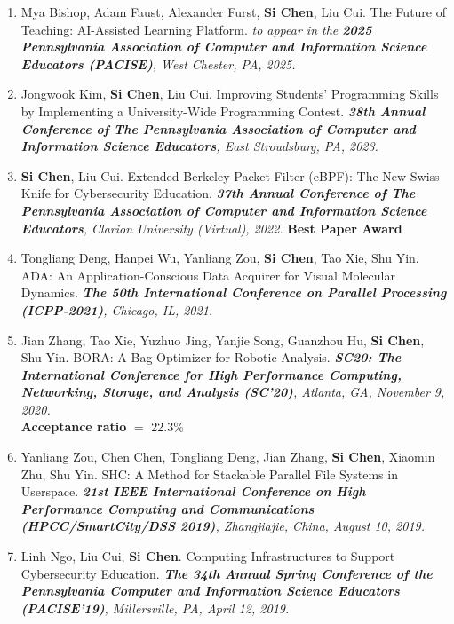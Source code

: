 \documentclass[letter]{article}
\newcommand{\publication}[4]{\item #1. #2. \emph{#3.} #4}
\begin{document}
\begin{description}
\begin{enumerate}[{C-}1.]
\publication{Mya Bishop, Adam Faust, Alexander Furst, \textbf{Si Chen}, Liu Cui}
            {The Future of Teaching: AI-Assisted Learning Platform}
            {\textit{to appear in} the \textbf{2025 Pennsylvania Association of Computer and Information Science Educators (PACISE)}, West Chester, PA, 2025}\\



\publication{Jongwook Kim, \textbf{Si Chen}, Liu Cui} {Improving Students' Programming Skills by Implementing a University-Wide Programming Contest} {\textbf{38th Annual Conference of The Pennsylvania Association of Computer and Information Science Educators}, East Stroudsburg, PA, 2023}\\

\publication{\textbf{Si Chen}, Liu Cui} {Extended Berkeley Packet Filter (eBPF): The New Swiss Knife for Cybersecurity Education}  {\textbf{37th Annual Conference of The Pennsylvania Association of Computer and Information Science Educators}, Clarion University (Virtual), 2022}
\textbf{Best Paper Award}\\

\publication{Tongliang Deng, Hanpei Wu, Yanliang Zou, \textbf{Si Chen}, Tao Xie, Shu Yin} {ADA: An Application-Conscious Data Acquirer for Visual Molecular Dynamics}  {\textbf{The 50th International Conference on Parallel Processing (ICPP-2021)}, Chicago, IL, 2021}\\

\publication{Jian Zhang, Tao Xie, Yuzhuo Jing, Yanjie Song, Guanzhou Hu, \textbf{Si Chen}, Shu Yin} {BORA: A Bag Optimizer for Robotic Analysis}  {\textbf{SC20: The International Conference for High Performance Computing, Networking, Storage, and Analysis (SC'20)}, Atlanta, GA, November 9, 2020} \\ 
\textbf{Acceptance ratio} $=$ 22.3\% \\

\publication{Yanliang Zou, Chen Chen, Tongliang Deng, Jian Zhang, \textbf{Si Chen}, Xiaomin Zhu, Shu Yin} {SHC: A Method for Stackable Parallel File Systems in Userspace}  {\textbf{21st IEEE International Conference on High Performance Computing and Communications (HPCC/SmartCity/DSS 2019)}, Zhangjiajie, China, August 10, 2019} \\ 

\publication{Linh Ngo, Liu Cui, \textbf{Si Chen}} {Computing Infrastructures to Support Cybersecurity Education}  {\textbf{The 34th Annual Spring Conference of the Pennsylvania Computer and Information Science Educators (PACISE'19)}, Millersville, PA, April 12, 2019} \\


\end{enumerate}
\end{description}
\end{document}
